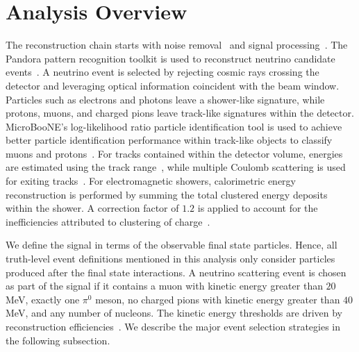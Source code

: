 \documentclass[%
 reprint,
 amsmath,amssymb, longbibliography,
 aps, 
 prd,
 twocolumn,
 showpacs,
 superscriptaddress
]{revtex4-2}
\begin{document}
\section{Analysis Overview}
The reconstruction chain starts with noise removal~\cite{Noise_removal} and signal processing~\cite{Adams_2018_2}. The Pandora pattern recognition toolkit is used to reconstruct neutrino candidate events~\cite{R_Acciarri_2018_Pandora}. A neutrino event is selected by rejecting cosmic rays crossing the detector and leveraging optical information coincident with the beam window. Particles such as electrons and photons leave a shower-like signature, while protons, muons, and charged pions leave track-like signatures within the detector. MicroBooNE’s log-likelihood ratio particle identification tool is used to achieve better particle identification performance within track-like objects to classify muons and protons~\cite{JHEP}. For tracks contained within the detector volume, energies are estimated using the track range~\cite{148751}, while multiple Coulomb scattering is used for exiting tracks~\cite{Abratenko_2017, LYNCH19916, HIGHLAND1975497}. For electromagnetic showers, calorimetric energy reconstruction is performed by summing the total clustered energy deposits within the shower. A correction factor of $1.2$ is applied to account for the inefficiencies attributed to clustering of charge~\cite{PhysRevD.105.112004}.

We define the signal in terms of the observable final state particles. Hence, all truth-level event definitions mentioned in this analysis only consider particles produced after the final state interactions. A neutrino scattering event is chosen as part of the signal if it contains a muon with kinetic energy greater than $20$ MeV, exactly one $\pi^0$ meson, no charged pions with kinetic energy greater than $40$ MeV, and any number of nucleons. The kinetic energy thresholds are driven by reconstruction efficiencies~\cite{supp_mat}. 
We describe the major event selection strategies in the following subsection. 
\end{document}
